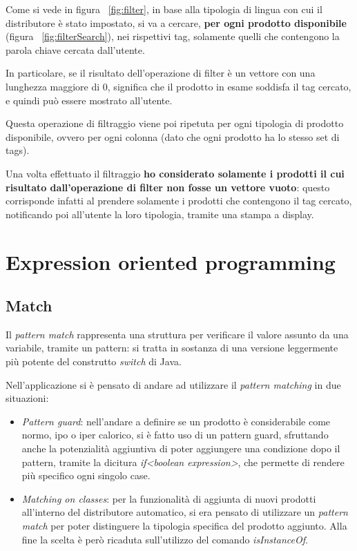 Come si vede in figura ~\ref{fig:filter}, in base alla tipologia di lingua con cui il distributore è stato impostato, si va a cercare, \textbf{per ogni prodotto disponibile} (figura ~\ref{fig:filterSearch}), nei rispettivi tag, solamente quelli che contengono la parola chiave cercata dall'utente.

In particolare, se il risultato dell'operazione di filter è un vettore con una lunghezza maggiore di 0, significa che il prodotto in esame soddisfa il tag cercato, e quindi può essere mostrato all'utente. 

Questa operazione di filtraggio viene poi ripetuta per ogni tipologia di prodotto disponibile, ovvero per ogni colonna (dato che ogni prodotto ha lo stesso set di tags).

Una volta effettuato il filtraggio \textbf{ho considerato solamente i prodotti il cui risultato dall'operazione di filter non fosse un vettore vuoto}: questo corrisponde infatti al prendere solamente i prodotti che contengono il tag cercato, notificando poi all'utente la loro tipologia, tramite una stampa a display.

\section{Expression oriented programming}
\label{sec:match_sealed}
\subsection{Match}
Il \textit{pattern match} rappresenta una struttura per verificare il valore assunto da una variabile, tramite un pattern: si tratta in sostanza di una versione leggermente più potente del construtto \textit{switch} di Java.

Nell'applicazione si è pensato di andare ad utilizzare il \textit{pattern matching} in due situazioni:
\begin{itemize}
	\item \textit{Pattern guard}: nell'andare a definire se un prodotto è considerabile come normo, ipo o iper calorico, si è fatto uso di un pattern guard, sfruttando anche la potenzialità aggiuntiva di poter aggiungere una condizione dopo il pattern, tramite la dicitura \textit{if<boolean expression>}, che permette di rendere più specifico ogni singolo case.
	\item \textit{Matching on classes}: per la funzionalità di aggiunta di nuovi prodotti all'interno del distributore automatico, si era pensato di utilizzare un \textit{pattern match} per poter distinguere la tipologia specifica del prodotto aggiunto. Alla fine la scelta è però ricaduta sull'utilizzo del comando \textit{isInstanceOf}.
\end{itemize}
